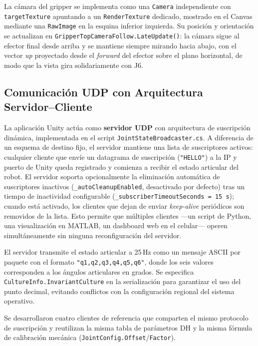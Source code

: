 La cámara del gripper se implementa como una \texttt{Camera} independiente con \texttt{targetTexture} apuntando a un \texttt{RenderTexture} dedicado, mostrado en el Canvas mediante una \texttt{RawImage} en la esquina inferior izquierda. Su posición y orientación se actualizan en \texttt{GripperTopCameraFollow.LateUpdate()}: la cámara sigue al efector final desde arriba y se mantiene siempre mirando hacia abajo, con el vector \textit{up} proyectado desde el \textit{forward} del efector sobre el plano horizontal, de modo que la vista gira solidariamente con J6.

\subsection{Comunicación UDP con Arquitectura Servidor--Cliente}

La aplicación Unity actúa como \textbf{servidor UDP} con arquitectura de suscripción dinámica, implementada en el script \texttt{JointStateBroadcaster.cs}. A diferencia de un esquema de destino fijo, el servidor mantiene una lista de suscriptores activos: cualquier cliente que envíe un datagrama de suscripción (\texttt{"HELLO"}) a la IP y puerto de Unity queda registrado y comienza a recibir el estado articular del robot. El servidor soporta opcionalmente la eliminación automática de suscriptores inactivos (\texttt{\_autoCleanupEnabled}, desactivado por defecto) tras un tiempo de inactividad configurable (\texttt{\_subscriberTimeoutSeconds = 15\,s}); cuando está activado, los clientes que dejan de enviar \textit{keep-alive} periódicos son removidos de la lista. Esto permite que múltiples clientes ---un script de Python, una visualización en MATLAB, un dashboard web en el celular--- operen simultáneamente sin ninguna reconfiguración del servidor.

El servidor transmite el estado articular a 25\,Hz como un mensaje ASCII por paquete con el formato \texttt{"q1,q2,q3,q4,q5,q6"}, donde los seis valores corresponden a los ángulos articulares en grados. Se especifica \texttt{CultureInfo.InvariantCulture} en la serialización para garantizar el uso del punto decimal, evitando conflictos con la configuración regional del sistema operativo.

Se desarrollaron cuatro clientes de referencia que comparten el mismo protocolo de suscripción y reutilizan la misma tabla de parámetros DH y la misma fórmula de calibración mecánica (\texttt{JointConfig.\allowbreak Offset}/\texttt{Factor}).

